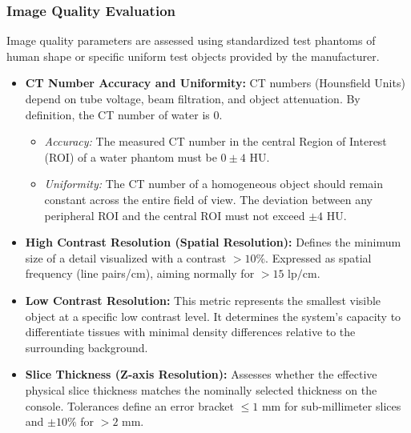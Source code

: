 \subsubsection{Image Quality Evaluation}
Image quality parameters are assessed using standardized test phantoms of human shape or specific uniform test objects provided by the manufacturer.
\begin{itemize}
    \item \textbf{CT Number Accuracy and Uniformity:} CT numbers (Hounsfield Units) depend on tube voltage, beam filtration, and object attenuation. By definition, the CT number of water is 0. 
    \begin{itemize}
        \item \textit{Accuracy:} The measured CT number in the central Region of Interest (ROI) of a water phantom must be $0 \pm 4$ HU.
        \item \textit{Uniformity:} The CT number of a homogeneous object should remain constant across the entire field of view. The deviation between any peripheral ROI and the central ROI must not exceed $\pm 4$ HU.
    \end{itemize}
    \item \textbf{High Contrast Resolution (Spatial Resolution):} Defines the minimum size of a detail visualized with a contrast $> 10\%$. Expressed as spatial frequency (line pairs/cm), aiming normally for $> 15 \text{ lp/cm}$.
    \item \textbf{Low Contrast Resolution:} This metric represents the smallest visible object at a specific low contrast level. It determines the system's capacity to differentiate tissues with minimal density differences relative to the surrounding background.
    \item \textbf{Slice Thickness (Z-axis Resolution):} Assesses whether the effective physical slice thickness matches the nominally selected thickness on the console. Tolerances define an error bracket $\leq 1\text{ mm}$ for sub-millimeter slices and $\pm 10\%$ for $> 2\text{ mm}$.
\end{itemize}

